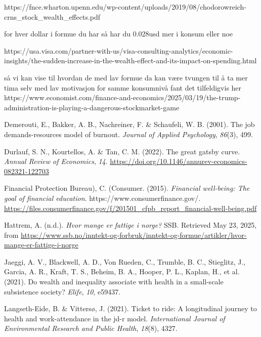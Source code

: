 \documentclass[
  12pt,
  a4paper,
  DIV=11,
  numbers=noendperiod]{scrartcl}
\newlength{\cslhangindent}
\newenvironment{CSLReferences}[2] %
 {\begin{list}{}{%
  \setlength{\itemindent}{0pt}
  \setlength{\leftmargin}{0pt}
  \setlength{\parsep}{0pt}
  \ifodd #1
   \setlength{\leftmargin}{\cslhangindent}
   \setlength{\itemindent}{-1\cslhangindent}
  \fi
  \setlength{\itemsep}{#2\baselineskip}}}
 {\end{list}}
\begin{document}
https://fnce.wharton.upenn.edu/wp-content/uploads/2019/08/chodorowreich-crns\_stock\_wealth\_effects.pdf

for hver dollar i formue du har så har du 0.028usd mer i konsum eller
noe

https://usa.visa.com/partner-with-us/visa-consulting-analytics/economic-insights/the-sudden-increase-in-the-wealth-effect-and-its-impact-on-spending.html

så vi kan vise til hvordan de med lav formue da kan være tvungen til å
ta mer tima selv med lav motivasjon for samme konsumnivå fant det
tilfeldigvis her
https://www.economist.com/finance-and-economics/2025/03/19/the-trump-administration-is-playing-a-dangerous-stockmarket-game

\label{refs}
\begin{CSLReferences}{1}{0}
Demerouti, E., Bakker, A. B., Nachreiner, F. \& Schaufeli, W. B. (2001).
The job demands-resources model of burnout. \emph{Journal of Applied
Psychology}, \emph{86}(3), 499.

Durlauf, S. N., Kourtellos, A. \& Tan, C. M. (2022). The great gatsby
curve. \emph{Annual Review of Economics}, \emph{14}.
\url{https://doi.org/10.1146/annurev-economics-082321-122703}

Financial Protection Bureau), C. (Consumer. (2015). \emph{Financial
well-being: The goal of financial education}.
https://www.consumerfinance.gov/.
\url{https://files.consumerfinance.gov/f/201501_cfpb_report_financial-well-being.pdf}

Hattrem, A. (n.d.). \emph{Hvor mange er fattige i norge?} SSB. Retrieved
May 23, 2025, from
\url{https://www.ssb.no/inntekt-og-forbruk/inntekt-og-formue/artikler/hvor-mange-er-fattige-i-norge}

Jaeggi, A. V., Blackwell, A. D., Von Rueden, C., Trumble, B. C.,
Stieglitz, J., Garcia, A. R., Kraft, T. S., Beheim, B. A., Hooper, P.
L., Kaplan, H., et al. (2021). Do wealth and inequality associate with
health in a small-scale subsistence society? \emph{Elife}, \emph{10},
e59437.

Langseth-Eide, B. \& Vittersø, J. (2021). Ticket to ride: A longitudinal
journey to health and work-attendance in the jd-r model.
\emph{International Journal of Environmental Research and Public
Health}, \emph{18}(8), 4327.


\end{CSLReferences}
\end{document}
